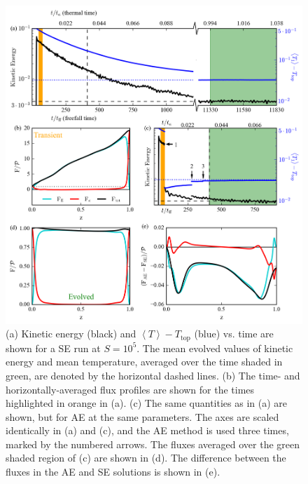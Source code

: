 \documentclass[aps, pre, onecolumn, nofootinbib, notitlepage, groupedaddress, amsfonts, amssymb, amsmath, longbibliography]{revtex4-1}
\newcommand{\angles}[1]{\ensuremath{\left\langle #1 \right\rangle}}
\begin{document}
\begin{figure}[p!]
\includegraphics[width=\textwidth]{./figs/time_trace.png}
\caption{(a) Kinetic energy (black) and $\angles{T} - T_{\text{top}}$ (blue)  vs. time are shown
for a SE run at $S = 10^5$. The mean evolved values of kinetic energy and mean temperature,
averaged over the time shaded in green,
are denoted by the horizontal dashed lines. (b) The time- and horizontally-averaged
flux profiles are shown for the times highlighted in orange in (a).
(c) The same quantities as in (a) are shown, but for AE at the same parameters.
The axes are scaled identically in (a) and (c), and the AE method is used three times, marked by
the numbered arrows. The fluxes averaged over the green shaded region of (c)
are shown in (d). The difference between
the fluxes in the AE and SE solutions is shown in (e). \label{fig:time_trace} }
\end{figure}
\end{document}
